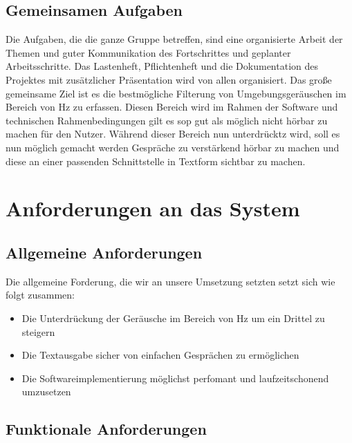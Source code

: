 \documentclass{article}
\begin{document}
\subsection{Gemeinsamen Aufgaben}
Die Aufgaben, die die ganze Gruppe betreffen, sind eine organisierte Arbeit der Themen und guter Kommunikation des Fortschrittes und geplanter Arbeitsschritte. Das Lastenheft, Pflichtenheft und die Dokumentation des Projektes mit zusätzlicher Präsentation wird von allen organisiert. 
Das große gemeinsame Ziel ist es die bestmögliche Filterung von Umgebungsgeräuschen im Bereich von Hz zu erfassen. Diesen Bereich wird im Rahmen der Software und technischen Rahmenbedingungen gilt es sop gut als möglich nicht hörbar zu machen für den Nutzer. Während dieser Bereich nun unterdrücktz wird, soll es nun möglich gemacht werden Gespräche zu verstärkend hörbar zu machen und diese an einer passenden Schnittstelle in Textform sichtbar zu machen.



\section{Anforderungen an das System}

\subsection{Allgemeine Anforderungen}
Die allgemeine Forderung, die wir an unsere Umsetzung setzten setzt sich wie folgt zusammen:
\begin{itemize}
    \item Die Unterdrückung der Geräusche im Bereich von Hz um ein Drittel zu steigern %
    \item Die Textausgabe sicher von einfachen Gesprächen zu ermöglichen 
    \item Die Softwareimplementierung möglichst perfomant und laufzeitschonend umzusetzen
\end{itemize}

\subsection{Funktionale Anforderungen}
\end{document}
